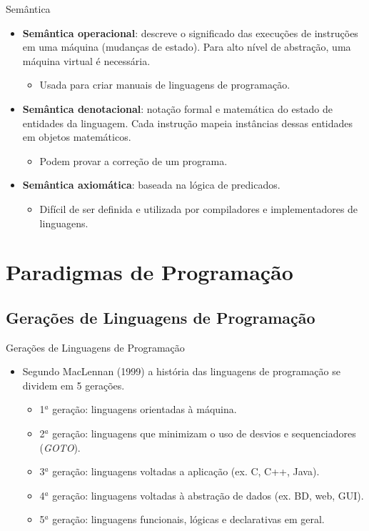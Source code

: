 \documentclass[handout, aspectratio=169]{beamer}
\newcommand{\bi}{\begin{itemize}[<+->]}
\newcommand{\ei}{\end{itemize}}
\begin{document}
\begin{frame}{Semântica}
	\begin{itemize}
		\item \textbf{Semântica operacional}: descreve o significado das execuções de instruções em uma máquina (mudanças de estado). Para alto nível de abstração, uma máquina virtual é necessária.
		\begin{itemize}
			\item Usada para criar manuais de linguagens de programação.
		\end{itemize}
		\item \textbf{Semântica denotacional}: notação formal e matemática do estado de entidades da linguagem. Cada instrução mapeia instâncias dessas entidades em objetos matemáticos.
		\begin{itemize}
			\item Podem provar a correção de um programa.
		\end{itemize}
		\item \textbf{Semântica axiomática}: baseada na lógica de predicados.
		\begin{itemize}
			\item Difícil de ser definida e utilizada por compiladores e implementadores de linguagens.
		\end{itemize}
	\end{itemize}
\end{frame}

\section{Paradigmas de Programação}

\subsection{Gerações de Linguagens de Programação}

\begin{frame}{Gerações de Linguagens de Programação}
		\bi
			\item Segundo MacLennan (1999) a história das linguagens de programação se dividem em 5 gerações.
				\bi
					\item 1$^a$ geração: linguagens orientadas à máquina.
                    \item 2$^a$ geração: linguagens que minimizam o uso de desvios e sequenciadores (\textit{GOTO}).
                    \item 3$^a$ geração: linguagens voltadas a aplicação (ex. C, C++, Java).
                    \item 4$^a$ geração: linguagens voltadas à abstração de dados (ex. BD, web, GUI).
                    \item 5$^a$ geração: linguagens funcionais, lógicas e declarativas em geral.
				\ei

		\ei
 \end{frame}
\end{document}

